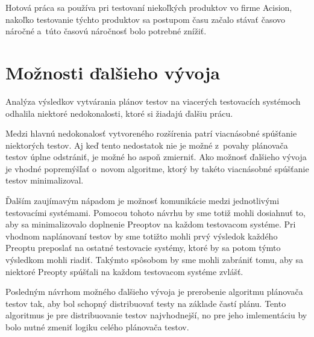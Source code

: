 Hotová práca sa používa pri testovaní niekoľkých produktov vo
firme Acision, nakoľko testovanie týchto produktov sa postupom času 
začalo stávať časovo náročné a~túto časovú náročnosť bolo potrebné znížiť.


\section{Možnosti ďalšieho vývoja}
\label{sekcia:moznosti_dalsieho_vyvoja}
Analýza výsledkov vytvárania plánov testov na viacerých testovacích systémoch
odhalila niektoré nedokonalosti, ktoré si žiadajú ďalšiu prácu. 

Medzi hlavnú nedokonalosť vytvoreného rozšírenia patrí viacnásobné spúšťanie
niektorých testov. Aj keď tento nedostatok nie je možné z~povahy 
plánovača testov úplne odstrániť, je možné ho aspoň zmierniť. 
Ako možnosť ďalšieho vývoja je vhodné popremýšľať o~novom algoritme, ktorý
by takéto viacnásobné spúšťanie testov minimalizoval.

Ďalším zaujímavým nápadom je možnosť komunikácie medzi jednotlivými 
testovacími systémami. Pomocou tohoto návrhu by sme totiž mohli dosiahnuť to,
aby sa minimalizovalo doplnenie Preoptov na každom testovacom systéme. 
Pri vhodnom naplánovaní testov by sme totižto mohli prvý výsledok každého
Preoptu preposlať na ostatné testovacie systémy, ktoré by sa potom týmto
výsledkom mohli riadiť.  Takýmto spôsobom by sme mohli zabrániť tomu,
aby sa niektoré Preopty spúšťali na každom testovacom systéme zvlášť.

Posledným návrhom možného ďalšieho vývoja je prerobenie algoritmu plánovača 
testov tak, aby bol schopný distribuovať testy na základe častí plánu.
Tento algoritmus je pre distribuovanie testov najvhodnejší, no pre jeho imlementáciu
by bolo nutné zmeniť logiku celého plánovača testov.

